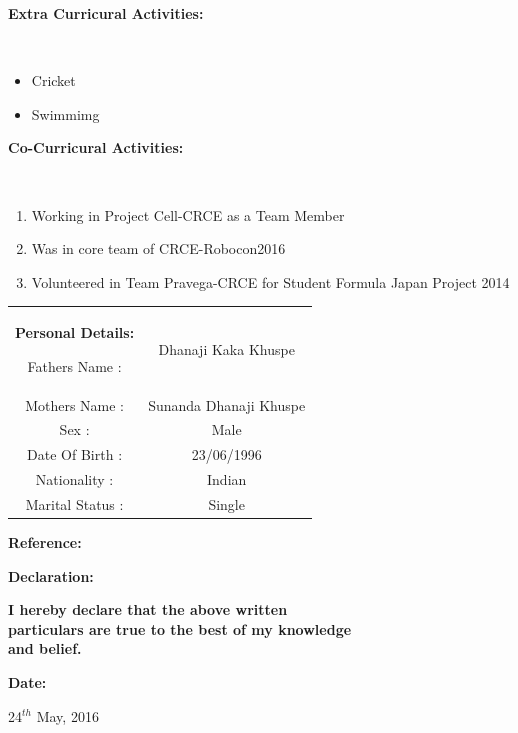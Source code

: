 \documentclass[a4paper]{article}
\begin{document}
\begin{flushleft}
				\begin{Large}\vspace{0.1in}\textbf{Extra Curricural Activities:}\end{Large}\\
				\begin{itemize}
					\item Cricket
					\item Swimmimg
				\end{itemize}
				
			\begin{Large}\vspace{0.1in}\textbf{Co-Curricural Activities:}\end{Large}\\
			\begin{enumerate}
					\item Working in Project Cell-CRCE as a Team Member
					\item Was in core team of CRCE-Robocon2016
					\item Volunteered in Team Pravega-CRCE for Student Formula Japan Project 2014
			\end{enumerate}
			

			\begin{tabular}{ cc }
				\begin{Large}\vspace{0.1in}\textbf{Personal Details:}\end{Large}
				\hfill Fathers Name : & Dhanaji Kaka Khuspe \\ 
				\hfill Mothers Name : & Sunanda Dhanaji Khuspe \\  
				\hfill Sex : & Male   \\ 
				\hfill Date Of Birth : & 23/06/1996  \\
				\hfill Nationality : & Indian  \\
				\hfill Marital Status : & Single
			\end{tabular}
			
			\begin{Large}\vspace{0.1in}\textbf{Reference:}\end{Large}
			
			
			\begin{Large}\vspace{0.2in}\textbf{Declaration:}\end{Large}
			  \textbf{I hereby declare that the above written}\\\hspace{1.25in}\textbf{particulars are true to the best of my knowledge}\\\hspace{1.25in}\textbf{and belief.}\\
			  

				\begin{Large}\vspace{0.1in}\textbf{Date:}\end{Large}
				\hspace{0.68in}24$^{th}$ May, 2016
				
	\end{flushleft}
\end{document}
